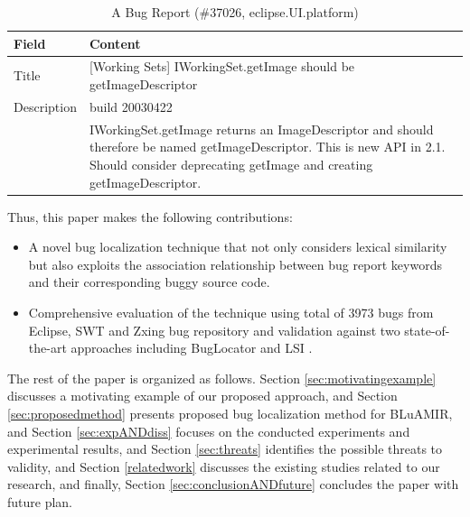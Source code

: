 \documentclass[conference]{IEEEtran}
\begin{document}
\begin{table}[htbp]
	\caption{A Bug Report (\#37026, eclipse.UI.platform)}
	\label{tab:BugInfo}
	\begin{center}
		\begin{tabular}{ p{1.5cm} | p{6cm}}
			\hline
			\textbf{Field}  & \textbf{Content} \\
			\hline
			\hline
			Title & [Working Sets] IWorkingSet.getImage should be  getImageDescriptor
			\\
			\hline
			Description &  build 20030422 \\ &
			IWorkingSet.getImage returns an ImageDescriptor and should therefore be named 
			getImageDescriptor.
			This is new API in 2.1. Should consider deprecating getImage and creating 
			getImageDescriptor.\\
			\hline
		\end{tabular}
	\end{center}
\end{table}


Thus, this paper makes the following contributions:
\begin{itemize}
	\item A novel bug localization technique that not only considers lexical similarity but also exploits the association relationship between bug report keywords and their corresponding buggy source code.
	\item Comprehensive evaluation of the technique using total of 3973 bugs from Eclipse, SWT and Zxing bug repository and validation against 
	two state-of-the-art approaches including BugLocator \cite{Jian} and LSI \cite{MarcusLSI}.
\end{itemize}

The rest of the paper is organized as follows. Section \ref{sec:motivatingexample} discusses a motivating example of our proposed approach, and Section \ref{sec:proposedmethod} presents proposed bug localization method for BLuAMIR, and Section \ref{sec:expANDdiss} focuses on the conducted experiments and experimental results, and Section \ref{sec:threats} identifies the possible threats to validity, and Section \ref{relatedwork}
discusses the existing studies related to our research, and finally,  
Section \ref{sec:conclusionANDfuture} concludes the paper with future plan.
\end{document}
